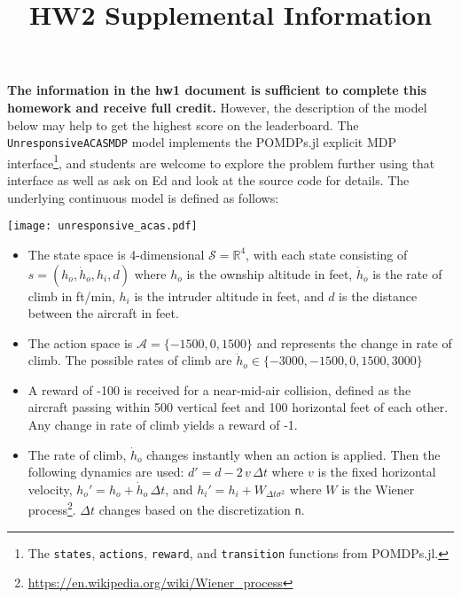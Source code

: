 \documentclass[]{article}
\title{HW2 Supplemental Information}
\begin{document}
\maketitle

\textbf{The information in the hw1 document is sufficient to complete this homework and receive full credit.} However, the description of the model below may help to get the highest score on the leaderboard. The \texttt{UnresponsiveACASMDP} model implements the POMDPs.jl explicit MDP interface\footnote{The \texttt{states}, \texttt{actions}, \texttt{reward}, and \texttt{transition} functions from POMDPs.jl.}, and students are welcome to explore the problem further using that interface as well as ask on Ed and look at the source code for details. The underlying continuous model is defined as follows:

\begin{center}
    \texttt{[image: unresponsive\_acas.pdf]}
\end{center}

\begin{itemize}
    \item The state space is 4-dimensional $\mathcal{S} = \mathbb{R}^4$, with each state consisting of $s=(h_o, \dot{h}_o, h_i, d)$ where $h_o$ is the ownship altitude in feet, $\dot{h}_o$ is the rate of climb in ft/min, $h_i$ is the intruder altitude in feet, and $d$ is the distance between the aircraft in feet.
    \item The action space is $\mathcal{A}=\{-1500, 0, 1500\}$ and represents the change in rate of climb. The possible rates of climb are $\dot{h}_o \in \{-3000, -1500, 0, 1500, 3000\}$
    \item A reward of -100 is received for a near-mid-air collision, defined as the aircraft passing within 500 vertical feet and 100 horizontal feet of each other. Any change in rate of climb yields a reward of -1.
    \item The rate of climb, $\dot{h}_o$ changes instantly when an action is applied. Then the following dynamics are used: $d' = d - 2\,v\,\Delta t$ where $v$ is the fixed horizontal velocity, $h_o' = h_o + \dot{h}_o\,\Delta t$, and $h_i' = h_i + W_{\Delta t \sigma^2}$ where $W$ is the Wiener process\footnote{\url{https://en.wikipedia.org/wiki/Wiener_process}}. $\Delta t$ changes based on the discretization \texttt{n}.
\end{itemize}
\end{document}
